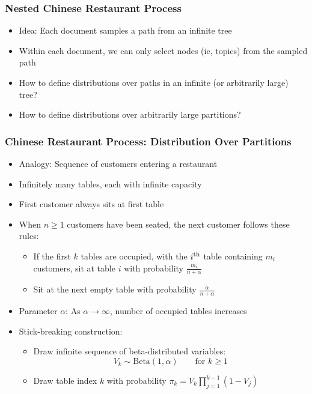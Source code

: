 \begin{frame}
\frametitle{Nested Chinese Restaurant Process}
\begin{itemize}[<+->]
\item Idea: Each document samples a path from an infinite tree
\item Within each document, we can only select nodes (ie, topics) from the sampled path
\vspace{1em}
\item How to define distributions over paths in an infinite (or arbitrarily large) tree? \\
\item How to define distributions over arbitrarily large partitions? \\
\end{itemize}
\end{frame}

\begin{frame}
\frametitle{Chinese Restaurant Process: Distribution Over Partitions}
\begin{itemize}[<+->]
\item Analogy: Sequence of customers entering a restaurant
\item Infinitely many tables, each with infinite capacity
\item First customer always sits at first table
\item When $n \geq 1$ customers have been seated, the next customer follows these rules:
    \begin{itemize}
    \item If the first $k$ tables are occupied, with the $i^{\text{th}}$ table containing $m_i$ customers, sit at table $i$ with probability $\frac{m_i}{n+\alpha}$
    \item Sit at the next empty table with probability $\frac{\alpha}{n + \alpha}$
    \end{itemize}
\item Parameter $\alpha$: As $\alpha \to \infty$, number of occupied tables increases
\item Stick-breaking construction:
    \begin{itemize}
    \item Draw infinite sequence of beta-distributed variables:
    \[ V_k \sim \text{Beta}(1, \alpha) \qquad \text{for $k \geq 1$} \]
    \item Draw table index $k$ with probability $\pi_k = V_k \prod_{j=1}^{k-1} (1-V_j)$
    \end{itemize}
\end{itemize}
\end{frame}

